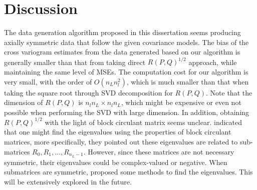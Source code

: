 \section{Discussion}
The data generation algorithm proposed in this dissertation seems producing axially symmetric data that follow the given covariance models. The bias of the cross variogram estimates from the data generated based on our algorithm is generally smaller than that from taking direct $R(P,Q)^{1/2}$ approach, while maintaining the same level of MSEs. The computation cost for our algorithm is very small, with the order of $O(n_L n_l^2)$, which is much smaller than that when taking the square root through SVD decomposition for $R(P,Q)$. Note that the dimension of $R(P,Q)$ is $n_ln_L \times n_ln_L$, which might be expensive or even not possible when performing the SVD with large dimension. In addition, obtaining $R(P,Q)^{1/2}$ with the light of block circulant matrix seems unclear. \cite{Li2013} indicated that one might find the eigenvalues using the properties of block circulant matrices, more specifically, they pointed out these eigenvalues are related to sub-matrices $R_0, R_1, \ldots, R_{n_L-1}$. However, since these matrices are not necessary symmetric, their eigenvalues could be complex-valued or negative. When submatrices are symmetric, \cite{Tee2005} proposed some methods to find the eigenvalues. This will be extensively explored in the future.

